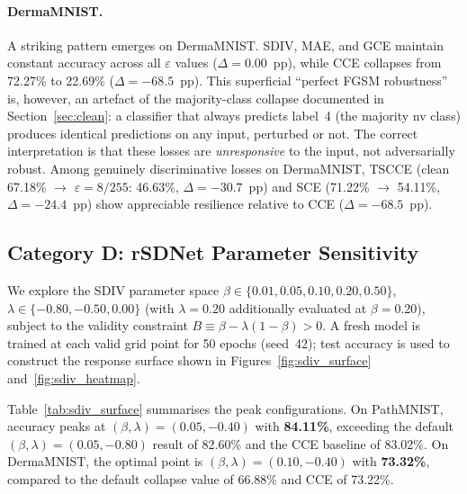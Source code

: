 \paragraph{DermaMNIST.}
A striking pattern emerges on DermaMNIST.
SDIV, MAE, and GCE maintain constant accuracy across all $\varepsilon$ values
($\Delta{=}0.00$~pp), while CCE collapses from 72.27\% to 22.69\%
($\Delta{=}{-68.5}$~pp).
This superficial ``perfect FGSM robustness'' is, however, an artefact of the
majority-class collapse documented in Section~\ref{sec:clean}:
a classifier that always predicts label~4 (the majority nv class) produces
identical predictions on any input, perturbed or not.
The correct interpretation is that these losses are \emph{unresponsive} to
the input, not adversarially robust.
Among genuinely discriminative losses on DermaMNIST, TSCCE (clean 67.18\%
$\to$ $\varepsilon{=}8/255$: 46.63\%, $\Delta{=}{-30.7}$~pp) and
SCE (71.22\% $\to$ 54.11\%, $\Delta{=}{-24.4}$~pp) show appreciable
resilience relative to CCE ($\Delta{=}{-68.5}$~pp).

\subsection{Category D: rSDNet Parameter Sensitivity}
\label{sec:surface}

We explore the SDIV parameter space
$\beta \in \{0.01, 0.05, 0.10, 0.20, 0.50\}$,
$\lambda \in \{-0.80, -0.50, 0.00\}$ (with $\lambda{=}0.20$ additionally
evaluated at $\beta{=}0.20$),
subject to the validity constraint $B \equiv \beta - \lambda(1{-}\beta) > 0$.
A fresh model is trained at each valid grid point for 50 epochs (seed~42);
test accuracy is used to construct the response surface shown in
Figures~\ref{fig:sdiv_surface} and~\ref{fig:sdiv_heatmap}.

Table~\ref{tab:sdiv_surface} summarises the peak configurations.
On PathMNIST, accuracy peaks at
$(\beta, \lambda) = (0.05, -0.40)$ with \textbf{84.11\%},
exceeding the default $(\beta, \lambda) = (0.05, -0.80)$ result of 82.60\%
and the CCE baseline of 83.02\%.
On DermaMNIST, the optimal point is
$(\beta, \lambda) = (0.10, -0.40)$ with \textbf{73.32\%},
compared to the default collapse value of 66.88\% and CCE of 73.22\%.

